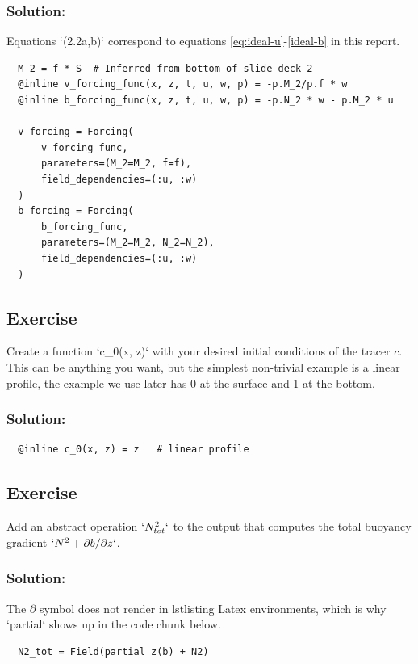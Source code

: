 \documentclass[12 pt]{article}
\numberwithin{equation}{section} %
\begin{document}
\subsubsection*{Solution:}
Equations `(2.2a,b)` correspond to equations \ref{eq:ideal-u}-\ref{ideal-b} in this report.

\begin{lstlisting}
  M_2 = f * S  # Inferred from bottom of slide deck 2
  @inline v_forcing_func(x, z, t, u, w, p) = -p.M_2/p.f * w 
  @inline b_forcing_func(x, z, t, u, w, p) = -p.N_2 * w - p.M_2 * u

  v_forcing = Forcing(
      v_forcing_func, 
      parameters=(M_2=M_2, f=f),
      field_dependencies=(:u, :w)
  )
  b_forcing = Forcing(
      b_forcing_func, 
      parameters=(M_2=M_2, N_2=N_2),
      field_dependencies=(:u, :w)
  )
\end{lstlisting}


\subsection{Exercise}
Create a function `c\_0(x, z)` with your desired initial conditions of the tracer $c$. This can be anything you want, but the simplest non-trivial example is a linear profile, the example we use later has 0 at the surface and 1 at the bottom.


\subsubsection*{Solution:}
\begin{lstlisting}
  @inline c_0(x, z) = z   # linear profile
\end{lstlisting}


\subsection{Exercise}
Add an abstract operation $`N^2_{tot}`$ to the output that computes the total buoyancy gradient $`{N^2 + \partial b / \partial z}`$.


\subsubsection{Solution:}
The $\partial$ symbol does not render in lstlisting Latex environments, which is why `partial` shows up in the code chunk below.

\begin{lstlisting}
  N2_tot = Field(partial z(b) + N2)
\end{lstlisting}
\end{document}
